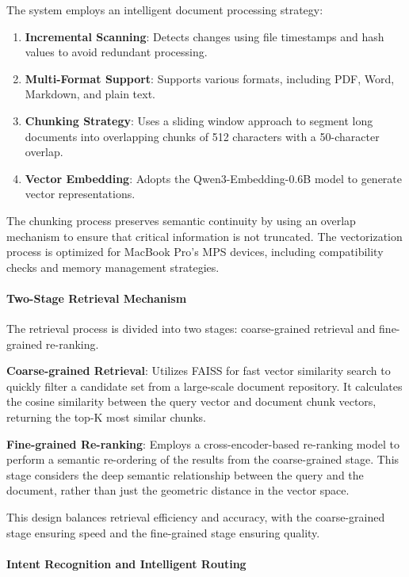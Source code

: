 The system employs an intelligent document processing strategy: \begin{enumerate} \item \textbf{Incremental Scanning}: Detects changes using file timestamps and hash values to avoid redundant processing. \item \textbf{Multi-Format Support}: Supports various formats, including PDF, Word, Markdown, and plain text. \item \textbf{Chunking Strategy}: Uses a sliding window approach to segment long documents into overlapping chunks of 512 characters with a 50-character overlap. \item \textbf{Vector Embedding}: Adopts the Qwen3-Embedding-0.6B model to generate vector representations. \end{enumerate}

The chunking process preserves semantic continuity by using an overlap mechanism to ensure that critical information is not truncated. The vectorization process is optimized for MacBook Pro's MPS devices, including compatibility checks and memory management strategies.

\paragraph{Two-Stage Retrieval Mechanism}

The retrieval process is divided into two stages: coarse-grained retrieval and fine-grained re-ranking.

\textbf{Coarse-grained Retrieval}: Utilizes FAISS for fast vector similarity search to quickly filter a candidate set from a large-scale document repository. It calculates the cosine similarity between the query vector and document chunk vectors, returning the top-K most similar chunks.

\textbf{Fine-grained Re-ranking}: Employs a cross-encoder-based re-ranking model to perform a semantic re-ordering of the results from the coarse-grained stage. This stage considers the deep semantic relationship between the query and the document, rather than just the geometric distance in the vector space.

This design balances retrieval efficiency and accuracy, with the coarse-grained stage ensuring speed and the fine-grained stage ensuring quality.

\paragraph{Intent Recognition and Intelligent Routing}

